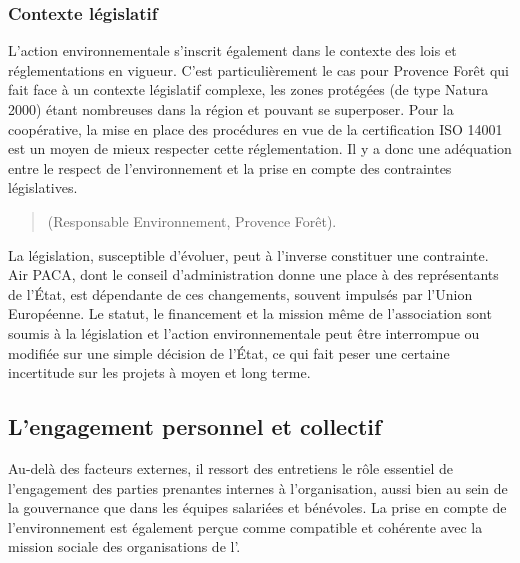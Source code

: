         \subsubsection{Contexte législatif}
        L'action environnementale s'inscrit également dans le contexte des lois et réglementations en vigueur. C'est particulièrement le cas pour Provence Forêt qui fait face à un contexte législatif complexe, les zones protégées (de type Natura 2000) étant nombreuses dans la région et pouvant se superposer. Pour la coopérative, la mise en place des procédures en vue de la certification ISO 14001 est un moyen de mieux respecter cette réglementation. Il y a donc une adéquation entre le respect de l'environnement et la prise en compte des contraintes législatives.
        \begin{quotation}
             (Responsable Environnement, Provence Forêt).
        \end{quotation}

        La législation, susceptible d'évoluer, peut à l'inverse constituer une contrainte. Air PACA, dont le conseil d'administration donne une place à des représentants de l'État, est dépendante de ces changements, souvent impulsés par l'Union Européenne. Le statut, le financement et la mission même de l'association sont soumis à la législation et l'action environnementale peut être interrompue ou modifiée sur une simple décision de l'État, ce qui fait peser une certaine incertitude sur les projets à moyen et long terme.

    \subsection{L'engagement personnel et collectif}
    Au-delà des facteurs externes, il ressort des entretiens le rôle essentiel de l'engagement des parties prenantes internes à l'organisation, aussi bien au sein de la gouvernance que dans les équipes salariées et bénévoles. La prise en compte de l'environnement est également perçue comme compatible et cohérente avec la mission sociale des organisations de l'\ess.

